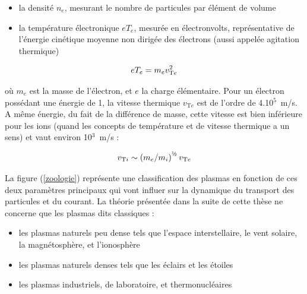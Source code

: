 \begin{refsection}
\begin{itemize}
  \item la densité $n_e$, mesurant le nombre
  de particules par élément de volume
  \item la température électronique $eT_e$, mesurée en électronvolts,
  représentative de l'énergie cinétique moyenne non dirigée des électrons (aussi appelée
   agitation thermique)
\end{itemize}

\begin{equation}
\label{1-VThermique}
	eT_{e}=m_{e} v_{\text{T}{e}}^{{2}}
\end{equation}

où $m_{e}$ est la masse de l'électron, et $e$ la charge élémentaire. Pour un électron possédant une énergie de
\unit{1}{\electronvolt}, la vitesse thermique $v_{\text{T}{e}}$ est de l'ordre
de 4.10$^5$~m/s. A même énergie, du fait de la différence de masse, cette vitesse est bien
inférieure pour les ions (quand les concepts de température et de
vitesse thermique a un sens) et vaut environ 10$^3 $~m/s :

\begin{equation}
	v_{\text{T}{i}}\sim\left(m_{e}/m_{i}\right)^{\text{\textonehalf}}
	v_{\text{T}{e}}
\end{equation}

La figure (\ref{zoologie}) représente une classification des plasmas
en fonction de ces deux paramètres principaux qui vont influer sur la dynamique du
transport des particules et du courant.
La théorie présentée dans la suite de cette thèse ne concerne que les plasmas
dits classiques :

\begin{itemize}
  \item les plasmas naturels peu dense tels que l'espace interstellaire,
  le vent solaire, la magnétosphère, et l'ionosphère
  \item les plasmas naturels denses tels que les éclairs et les étoiles
  \item les plasmas industriels, de laboratoire, et thermonucléaires
\end{itemize}


\end{refsection}
